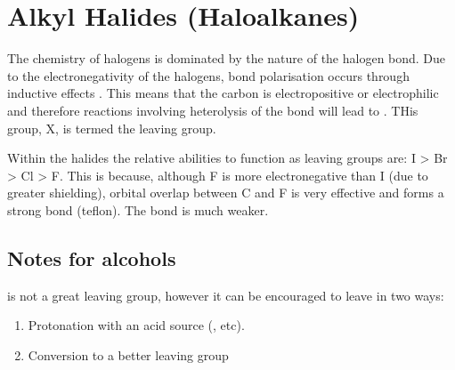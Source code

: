 \section{Alkyl Halides (Haloalkanes)}

The chemistry of halogens is dominated by the nature of the halogen bond. Due to
the electronegativity of the halogens, bond polarisation occurs through inductive
effects . This means that the carbon is
electropositive or electrophilic and therefore reactions involving heterolysis
of the  bond will lead to . THis group, X, is termed the leaving
group.

Within the halides the relative abilities to function as leaving groups are:
I > Br > Cl > F. This is because, although F is more electronegative than I (due
to greater shielding), orbital overlap between C and F is very effective and forms
a strong bond (teflon). The  bond is much weaker.

\subsection{Notes for alcohols}

 is not a great leaving group, however it can be encouraged to leave in two
ways:

\begin{enumerate}[label=\alph*)]

  \item Protonation with an acid source (, etc).

  \item Conversion to a better leaving group

\end{enumerate}